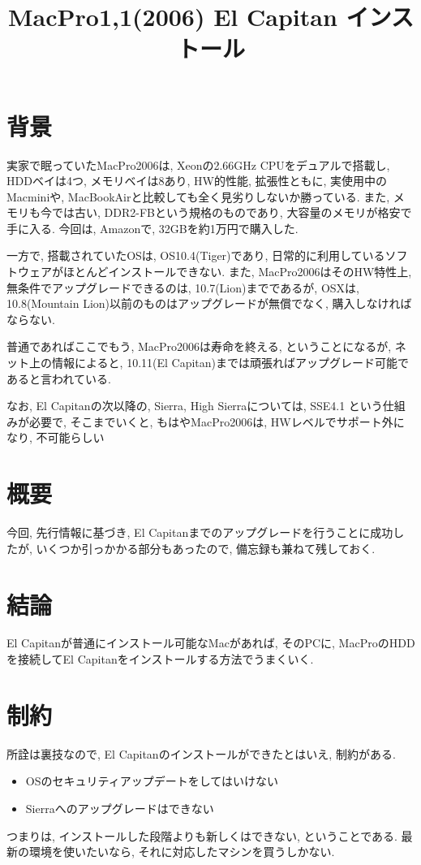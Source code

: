 \documentclass{jsarticle}
\title{MacPro1,1(2006) El Capitan インストール}
\begin{document}
\maketitle

\section{背景}
実家で眠っていたMacPro2006は, Xeonの2.66GHz CPUをデュアルで搭載し, HDDベイは4つ, メモリベイは8あり, HW的性能, 拡張性ともに, 実使用中のMacminiや, MacBookAirと比較しても全く見劣りしないか勝っている\cite{MacPro_Doc}. 
また, メモリも今では古い, DDR2-FBという規格のものであり, 大容量のメモリが格安で手に入る. 今回は, Amazonで, 32GBを約1万円で購入した. 

一方で, 搭載されていたOSは, OS10.4(Tiger)であり, 日常的に利用しているソフトウェアがほとんどインストールできない. 
また, MacPro2006はそのHW特性上, 無条件でアップグレードできるのは, 10.7(Lion)までである\cite{EFI_Issue_Doc}が, 
OSXは, 10.8(Mountain Lion)以前のものはアップグレードが無償でなく, 購入しなければならない. 

普通であればここでもう, MacPro2006は寿命を終える, ということになるが, ネット上の情報によると, 10.11(El Capitan)までは頑張ればアップグレード可能であると言われている\cite{Summary_Doc}. 

なお, El Capitanの次以降の, Sierra, High Sierraについては, SSE4.1 という仕組みが必要で, そこまでいくと, もはやMacPro2006は, HWレベルでサポート外になり, 不可能らしい\cite{Summary_Doc}

\section{概要}
今回, 先行情報に基づき, El Capitanまでのアップグレードを行うことに成功したが, いくつか引っかかる部分もあったので, 備忘録も兼ねて残しておく. 

\section{結論}
El Capitanが普通にインストール可能なMacがあれば, そのPCに, MacProのHDDを接続してEl Capitanをインストールする方法でうまくいく. 

\section{制約}
所詮は裏技なので, El Capitanのインストールができたとはいえ, 制約がある. 
\begin{itemize}
  \item OSのセキュリティアップデートをしてはいけない\cite{Security_Update_Issue_Doc}
  \item Sierraへのアップグレードはできない\cite{Summary_Doc}
\end{itemize}
つまりは, インストールした段階よりも新しくはできない, ということである. 
最新の環境を使いたいなら, それに対応したマシンを買うしかない. 
\end{document}
